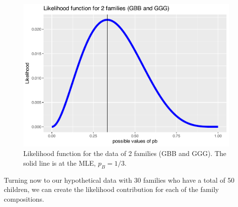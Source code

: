 \documentclass[
]{krantz}
\begin{document}
\begin{figure}

{\centering \includegraphics[width=0.9\linewidth]{bookdown-BeyondMLR_files/figure-latex/lik2-1} 

}

\caption{Likelihood function for the data of 2 families (GBB and GGG). The solid line is at the MLE,  ${p}_B=1/3$.}\label{fig:lik2}
\end{figure}

Turning now to our hypothetical data with 30 families who have a total of 50 children, we can create the likelihood contribution for each of the family compositions.

\begin{table}

\caption{\label{tab:table2chp2}The likelihood factors for the hypothetical data set of n=50 children.}
\centering
{}
\end{table}
\end{document}

